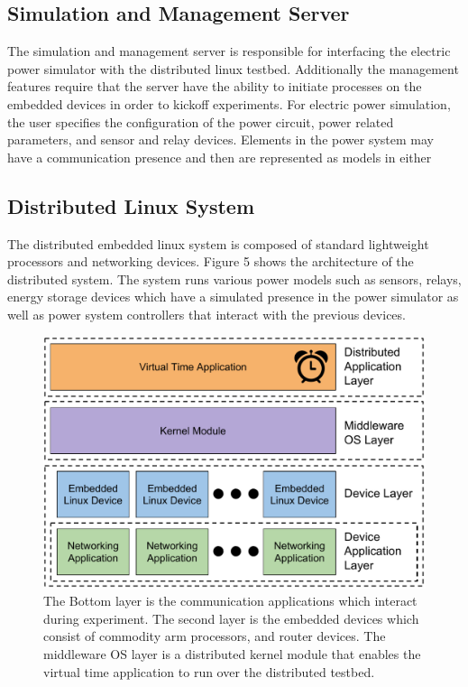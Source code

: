 \subsection{Simulation and Management Server}
The simulation and management server is responsible for interfacing the electric power simulator with the distributed linux testbed. Additionally the management features require that the server have the ability to initiate processes on the embedded devices in order to kickoff experiments. For electric power simulation, the user specifies the configuration of the power circuit, power related parameters, and sensor and relay devices. Elements in the power system may have a communication presence and then are represented as models in either

\subsection{Distributed Linux System}

The distributed embedded linux system is composed of standard lightweight processors and networking devices. Figure 5 shows the architecture of the distributed system. The system runs various power models such as sensors, relays, energy storage devices which have a simulated presence in the power simulator as well as power system controllers that interact with the previous devices.

\begin{figure}
  \centering
  \label{env}
  \includegraphics[scale=0.48]{Distributed_environment.pdf}
  \caption{
    The Bottom layer is the communication applications which interact during experiment. The second layer is the embedded devices which consist of commodity arm processors, and router devices. The middleware OS layer is a distributed kernel module that enables the virtual time application to run over the distributed testbed.
    }
\end{figure}


